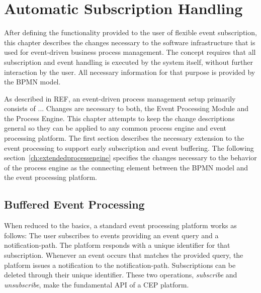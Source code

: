 \chapter{Automatic Subscription Handling}\label{ch:automaticsubscription}

After defining the functionality provided to the user of flexible event subscription, this chapter describes the changes necessary to the software infrastructure that is used for event-driven business process management.
The concept requires that all subscription and event handling is executed by the system itself, without further interaction by the user.
All necessary information for that purpose is provided by the BPMN model.

As described in REF, an event-driven process management setup primarily consists of ...
Changes are necessary to both, the Event Processing Module and the Process Engine. This chapter attempts to keep the change descriptions general so they can be applied to any common process engine and event processing platform.
The first section describes the necessary extension to the event processing to support early subscription and event buffering.
The following section~\autoref{ch:extendedprocessengine} specifies the changes necessary to the behavior of the process engine as the connecting element between the BPMN model and the event processing platform.

\section{Buffered Event Processing}
When reduced to the basics, a standard event processing platform works as follows: The user subscribes to events providing an event query and a notification-path. The platform responds with a unique identifier for that subscription.
Whenever an event occurs that matches the provided query, the platform issues a notification to the notification-path. Subscriptions can be deleted through their unique identifier.
These two operations, \textit{subscribe} and \textit{unsubscribe}, make the fundamental API of a CEP platform.
 


